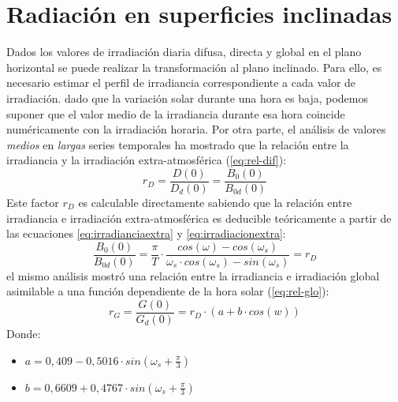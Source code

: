 \section{Radiación en superficies inclinadas}
\label{sec:org5419cff}
\label{sec:radiacion-superficies-inclinadas}
Dados los valores de irradiación diaria difusa, directa y global en el plano horizontal se puede realizar la transformación al plano inclinado. Para ello, es necesario estimar el perfil de irradiancia correspondiente a cada valor de irradiación. dado que la variación solar durante una hora es baja, podemos suponer que el valor medio de la irradiancia durante esa hora coincide numéricamente con la irradiación horaria. Por otra parte, el análisis de valores \emph{medios}  en \emph{largas} series temporales ha mostrado que la relación entre la irradiancia y la irradiación extra-atmosférica \cite{Collares-Pereira.Rabl1979} (\ref{eq:rel-dif}):
\begin{equation}
r_D=\frac{D(0)}{D_d(0)}=\frac{B_0(0)}{B_{0d}(0)}
\label{eq:rel-dif}
\end{equation}
Este factor \(r_D\) es calculable directamente sabiendo que la relación entre irradiancia e irradiación extra-atmosférica es deducible teóricamente a partir de las ecuaciones \ref{eq:irradianciaextra} y \ref{eq:irradiacionextra}:
\begin{equation}
\frac{B_0(0)}{B_{0d}(0)}=\frac{\pi}{T}\cdot \frac{cos(\omega)-cos(\omega_s)}{\omega_s\cdot cos(\omega_s)-sin(\omega_s)}=r_D
\label{eq:rel-dif2}
\end{equation}
el mismo análisis mostró una relación entre la irradiancia e irradiación global asimilable a una función dependiente de la hora solar (\ref{eq:rel-glo}):
\begin{equation}
r_G=\frac{G(0)}{G_d(0)}=r_D\cdot(a+b\cdot cos(w))
\label{eq:rel-glo}
\end{equation}
Donde:
\begin{itemize}
\item \(a=0,409-0,5016\cdot sin(\omega_s+\frac{\pi}{3})\)
\item \(b=0,6609+0,4767\cdot sin(\omega_s+\frac{\pi}{3})\)
\end{itemize}

